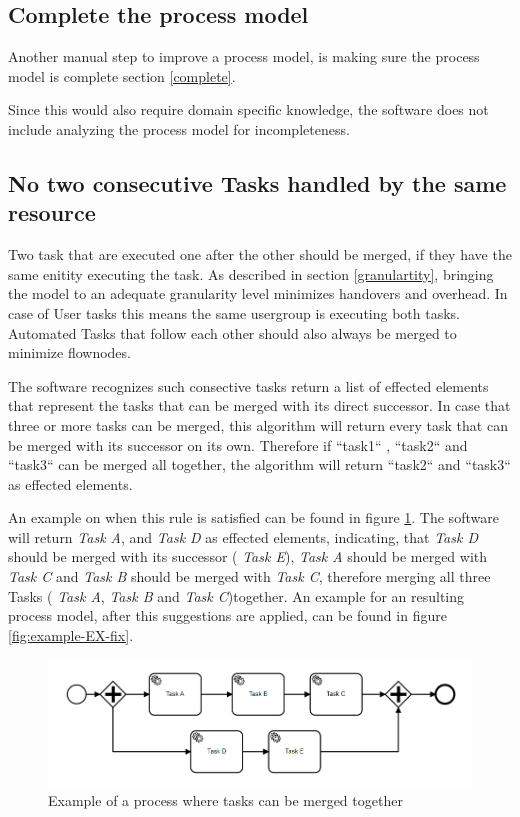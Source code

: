 \subsection{Complete the process model}
Another manual step to improve a process model, is making sure the process model is complete section \ref{complete}.

Since this would also require domain specific knowledge, the software does not include analyzing the process model for incompleteness.

\subsection{No two consecutive Tasks handled by the same resource}
Two task that are executed one after the other should be merged, if they have the same enitity executing the task. As described in section \ref{granulartity}, bringing the model to an adequate granularity level minimizes handovers and overhead. In case of User tasks this means the same usergroup is executing both tasks. Automated Tasks that follow each other should also always be merged to minimize flownodes.


The software recognizes such consective tasks return a list of effected elements that represent the tasks that can be merged with its direct successor. In case that three or more tasks can be merged, this algorithm will return every task that can be merged with its successor on its own. Therefore if ``task1`` , ``task2`` and ``task3`` can be merged all together, the algorithm will return ``task2`` and ``task3`` as effected elements.

An example on when this rule is satisfied can be found in figure \ref{fig:example-EX}. The software will return \textit{Task A},  and \textit{Task D} as effected elements, indicating, that  \textit{Task D} should be merged with its successor ( \textit{Task E}),  \textit{Task A} should be merged with  \textit{Task C} and  \textit{Task B} should be merged with  \textit{Task C}, therefore merging all three Tasks ( \textit{Task A}, \textit{Task B} and  \textit{Task C})together. An example for an resulting process model, after this suggestions are applied, can be found in figure \ref{fig:example-EX-fix}.

\begin{figure}[H]
	\centering
	\includegraphics[width=0.9\columnwidth]{graphics/merge-suggestion-1}
	\caption{Example of a process where tasks can be merged together} 
	\label{fig:example-EX} 
\end{figure}

